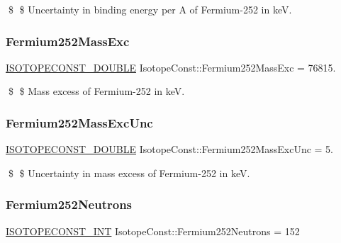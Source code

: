 \$ \$ Uncertainty in binding energy per A of Fermium-\/252 in keV. \mbox{\label{group___isotope_const-_fermium-_fm252_gae7906b0b1d84ec18654b54b4d20145a7}} 
\subsubsection{\texorpdfstring{Fermium252\+Mass\+Exc}{Fermium252MassExc}}
{\footnotesize\ttfamily \mbox{\hyperlink{group___isotope_const-_macros_ga8f45a7272ce02c0b4c65c44636ed719a}{I\+S\+O\+T\+O\+P\+E\+C\+O\+N\+S\+T\+\_\+\+D\+O\+U\+B\+LE}} Isotope\+Const\+::\+Fermium252\+Mass\+Exc = 76815.}

\$ \$ Mass excess of Fermium-\/252 in keV. \mbox{\label{group___isotope_const-_fermium-_fm252_gaca2c4a4c7d978dc10cec460e84f17781}} 
\subsubsection{\texorpdfstring{Fermium252\+Mass\+Exc\+Unc}{Fermium252MassExcUnc}}
{\footnotesize\ttfamily \mbox{\hyperlink{group___isotope_const-_macros_ga8f45a7272ce02c0b4c65c44636ed719a}{I\+S\+O\+T\+O\+P\+E\+C\+O\+N\+S\+T\+\_\+\+D\+O\+U\+B\+LE}} Isotope\+Const\+::\+Fermium252\+Mass\+Exc\+Unc = 5.}

\$ \$ Uncertainty in mass excess of Fermium-\/252 in keV. \mbox{\label{group___isotope_const-_fermium-_fm252_ga93c46138840d9c5a5fede9df5e827625}} 
\subsubsection{\texorpdfstring{Fermium252\+Neutrons}{Fermium252Neutrons}}
{\footnotesize\ttfamily \mbox{\hyperlink{group___isotope_const-_macros_ga5f18360b3e99483a35c32d789e62621c}{I\+S\+O\+T\+O\+P\+E\+C\+O\+N\+S\+T\+\_\+\+I\+NT}} Isotope\+Const\+::\+Fermium252\+Neutrons = 152}

